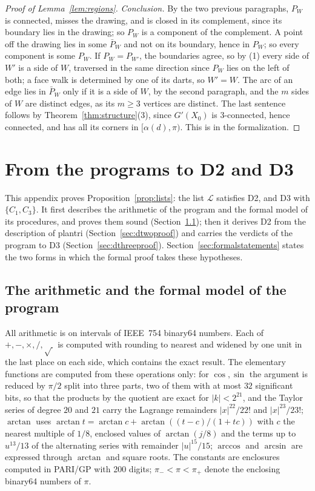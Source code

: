 \documentclass[12pt]{amsart}
\theoremstyle{definition}
\theoremstyle{plain}
\theoremstyle{definition}
\newcommand{\CI}{C_1}
\newcommand{\CIII}{C_3}
\begin{document}
\begin{proof}[Proof of Lemma~\ref{lem:regions}]
\emph{Conclusion.} By the two previous paragraphs, $P_W$ is connected, misses the drawing, and is closed in its complement, since its boundary lies in the drawing; so $P_W$ is a component of the complement. A point off the drawing lies in some $\bar P_W$ and not on its boundary, hence in $P_W$; so every component is some $P_W$. If $P_W=P_{W'}$, the boundaries agree, so by (1) every side of $W'$ is a side of $W$, traversed in the same direction since $P_W$ lies on the left of both; a face walk is determined by one of its darts, so $W'=W$. The arc of an edge lies in $\bar P_W$ only if it is a side of $W$, by the second paragraph, and the $m$ sides of $W$ are distinct edges, as its $m\ge3$ vertices are distinct. The last sentence follows by Theorem~\ref{thm:structure}(3), since $G'(X_0)$ is 3-connected, hence connected, and has all its corners in $[\alpha(d),\pi)$. This is  in the formalization.
\end{proof}

\section{From the programs to D2 and D3}\label{app:programs}

This appendix proves Proposition~\ref{prop:lists}: the list $\mathcal L$ satisfies D2, and D3 with $\{\CI,\CIII\}$. It first describes the arithmetic of the program and the formal model of its procedures, and proves them sound (Section~\ref{sec:model}); then it derives D2 from the description of plantri (Section~\ref{sec:dtwoproof}) and carries the verdicts of the program to D3 (Section~\ref{sec:dthreeproof}). Section~\ref{sec:formalstatements} states the two forms in which the formal proof takes these hypotheses.

\subsection{The arithmetic and the formal model of the program}\label{sec:model}
All arithmetic is on intervals of IEEE~754 binary64 numbers. Each of $+,-,\times,/,\sqrt{\ }$ is computed with rounding to nearest and widened by one unit in the last place on each side, which contains the exact result. The elementary functions are computed from these operations only: for $\cos,\sin$ the argument is reduced by $\pi/2$ split into three parts, two of them with at most $32$ significant bits, so that the products by the quotient are exact for $|k|<2^{21}$, and the Taylor series of degree $20$ and $21$ carry the Lagrange remainders $|x|^{22}/22!$ and $|x|^{23}/23!$; $\arctan$ uses $\arctan t=\arctan c+\arctan((t-c)/(1+tc))$ with $c$ the nearest multiple of $1/8$, enclosed values of $\arctan(j/8)$ and the terms up to $u^{13}/13$ of the alternating series with remainder $|u|^{15}/15$; $\arccos$ and $\arcsin$ are expressed through $\arctan$ and square roots. The constants are enclosures computed in PARI/GP with 200 digits; $\pi_-<\pi<\pi_+$ denote the enclosing binary64 numbers of $\pi$.
\end{document}
